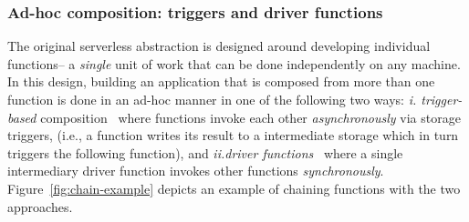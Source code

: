 \subsubsection{Ad-hoc composition: triggers and driver functions}
The original serverless abstraction is designed around developing individual functions-- a \textit{single} unit of work that can be done independently on any machine. In this design, building an application that  is composed from more than one function is done in an ad-hoc manner in one of the following two ways:  \textit{ i. trigger-based} composition~\cite{netherite} where functions invoke each other
\emph{asynchronously} via storage triggers, (i.e., a function writes its result to a intermediate storage which in turn triggers the following function), and  \textit{ii.driver
	functions}~\cite{beldi} where a single intermediary driver function invokes other functions
	\emph{synchronously}.   Figure~\ref{fig:chain-example} depicts an example of
	chaining functions with the two approaches. 
	
	 









